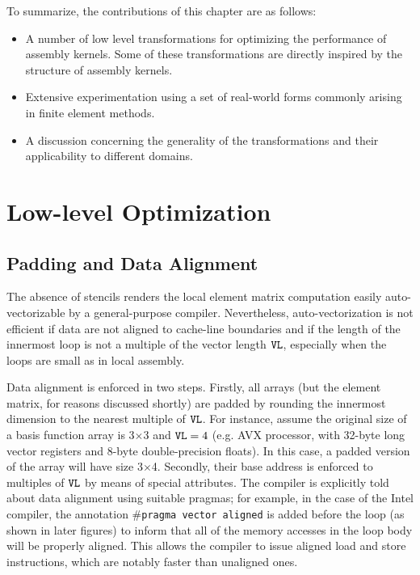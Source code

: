 To summarize, the contributions of this chapter are as follows:
\begin{itemize}
\item A number of low level transformations for optimizing the performance of assembly kernels. Some of these transformations are directly inspired by the structure of assembly kernels.
\item Extensive experimentation using a set of real-world forms commonly arising in finite element methods.
\item A discussion concerning the generality of the transformations and their applicability to different domains.
\end{itemize}

\section{Low-level Optimization}
\label{sec:lowlevelopt}


\subsection{Padding and Data Alignment}
\label{sec:coffee-padding}
The absence of stencils renders the local element matrix computation easily auto-vectorizable by a general-purpose compiler. Nevertheless, auto-vectorization is not efficient if data are not aligned to cache-line boundaries and if the length of the innermost loop is not a multiple of the vector length $\mbox{\texttt{VL}}$, especially when the loops are small as in local assembly. 

Data alignment is enforced in two steps. Firstly, all arrays (but the element matrix, for reasons discussed shortly) are padded by rounding the innermost dimension to the nearest multiple of $\mbox{\texttt{VL}}$. For instance, assume the original size of a basis function array is 3$\times$3 and $\mbox{\texttt{VL}}=4$ (e.g. AVX processor, with 32-byte long vector registers and 8-byte double-precision floats). In this case, a padded version of the array will have size 3$\times$4. Secondly, their base address is enforced to multiples of $\mbox{\texttt{VL}}$ by means of special attributes. The compiler is explicitly told about data alignment using suitable pragmas; for example, in the case of the Intel compiler, the annotation \texttt{$\#$pragma vector aligned} is added before the loop (as shown in later figures) to inform that all of the memory accesses in the loop body will be properly aligned. This allows the compiler to issue aligned load and store instructions, which are notably faster than unaligned ones.

